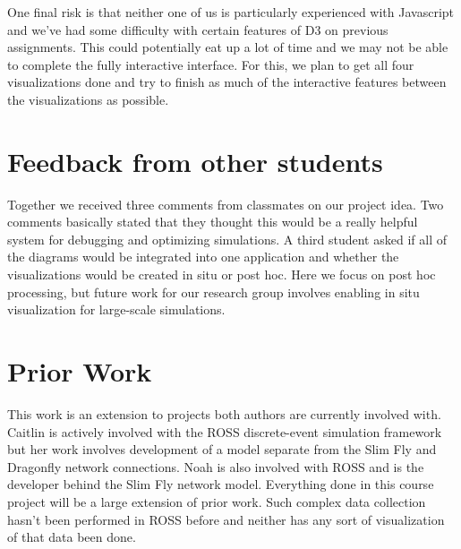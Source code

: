 \documentclass{acm_proc_article-sp}
\begin{document}
One final risk is that neither one of us is particularly experienced with Javascript and we've had some difficulty with certain features of D3 on previous assignments.   This could potentially eat up a lot of time and we may not be able to complete the fully interactive interface.  For this, we plan to get all four visualizations done and try to finish as much of the interactive features between the visualizations as possible.  
    

\section{Feedback from other students}
Together we received three comments from classmates on our project idea.  Two comments basically stated that they thought this would be a really helpful system for debugging and optimizing simulations.  A third student asked if all of the diagrams would be integrated into one application and whether the visualizations would be created in situ or post hoc.  Here we focus on post hoc processing, but future work for our research group involves enabling in situ visualization for large-scale simulations.  

\section{Prior Work}
This work is an extension to projects both authors are currently involved with. Caitlin is actively involved with the ROSS discrete-event simulation framework but her work involves development of a model separate from the Slim Fly and Dragonfly network connections. Noah is also involved with ROSS and is the developer behind the Slim Fly network model. Everything done in this course project will be a large extension of prior work. Such complex data collection hasn't been performed in ROSS before and neither has any sort of visualization of that data been done. 
\end{document}
